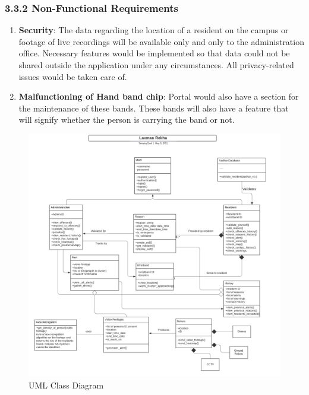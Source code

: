 \documentclass[eng]{FCEFyN-class}
\begin{document}
\subsubsection{3.3.2 Non-Functional Requirements}
\begin{enumerate}
    \item \textbf{Security}: The data regarding the location of a resident on the campus or footage of live recordings will be available only and only to the administration office. Necessary features would be implemented so that data could not be shared outside the application under any circumstances. All privacy-related issues would be taken care of.
    
    \item \textbf{Malfunctioning of Hand band chip}: Portal would also have a section for the maintenance of these bands. These bands will also have a feature that will signify whether the person is carrying the band or not. 
    
\end{enumerate}
\begin{figure}
    \centering
    \includegraphics[scale= 0.7]{filesFCEFyN-class/Laxman_Rekha.png}
    \caption{UML Class Diagram}
    \label{fig:my_label}
    \FloatBarrier
\end{figure}
\end{document}
